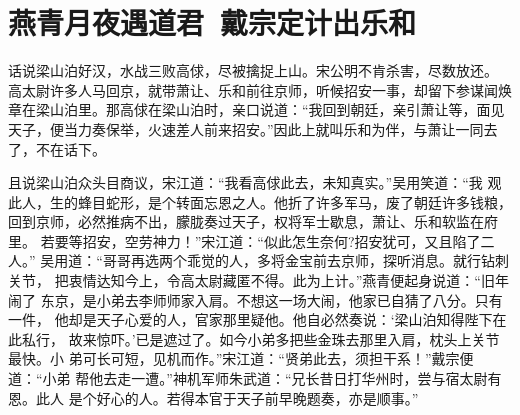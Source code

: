 \chapter{燕青月夜遇道君~戴宗定计出乐和}

话说梁山泊好汉，水战三败高俅，尽被擒捉上山。宋公明不肯杀害，尽数放还。
高太尉许多人马回京，就带萧让、乐和前往京师，听候招安一事，却留下参谋闻焕
章在梁山泊里。那高俅在梁山泊时，亲口说道：“我回到朝廷，亲引萧让等，面见
天子，便当力奏保举，火速差人前来招安。”因此上就叫乐和为伴，与萧让一同去
了，不在话下。

且说梁山泊众头目商议，宋江道：“我看高俅此去，未知真实。”吴用笑道：“我
观此人，生的蜂目蛇形，是个转面忘恩之人。他折了许多军马，废了朝廷许多钱粮，
回到京师，必然推病不出，朦胧奏过天子，权将军士歇息，萧让、乐和软监在府里。
若要等招安，空劳神力！”宋江道：“似此怎生奈何?招安犹可，又且陷了二人。”
吴用道：“哥哥再选两个乖觉的人，多将金宝前去京师，探听消息。就行钻刺关节，
把衷情达知今上，令高太尉藏匿不得。此为上计。”燕青便起身说道：“旧年闹了
东京，是小弟去李师师家入肩。不想这一场大闹，他家已自猜了八分。只有一件，
他却是天子心爱的人，官家那里疑他。他自必然奏说：‘梁山泊知得陛下在此私行，
故来惊吓。’已是遮过了。如今小弟多把些金珠去那里入肩，枕头上关节最快。小
弟可长可短，见机而作。”宋江道：“贤弟此去，须担干系！”戴宗便道：“小弟
帮他去走一遭。”神机军师朱武道：“兄长昔日打华州时，尝与宿太尉有恩。此人
是个好心的人。若得本官于天子前早晚题奏，亦是顺事。”

